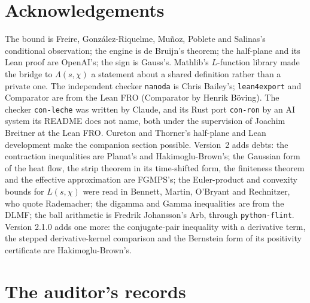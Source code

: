 \documentclass[11pt]{article}
\theoremstyle{definition}
\newcommand{\lean}[1]{\texttt{#1}}
\newcommand{\Lc}{\Lambda}
\begin{document}
\section*{Acknowledgements}

The bound is Freire, Gonz\'alez-Riquelme, Mu\~noz, Poblete and Salinas's conditional observation; the engine is de Bruijn's theorem; the half-plane and its Lean proof are OpenAI's; the sign is Gauss's. Mathlib's $L$-function library made the bridge to $\Lc(s,\chi)$ a statement about a shared definition rather than a private one. The independent checker \lean{nanoda} is Chris Bailey's; \lean{lean4export} and Comparator are from the Lean FRO (Comparator by Henrik B\"oving). The checker \lean{con-leche} \cite{conleche} was written by Claude, and its Rust port \lean{con-ron} \cite{conron} by an AI system its README does not name, both under the supervision of Joachim Breitner at the Lean FRO. Cureton and Thorner's half-plane and Lean development make the companion section possible. Version~2 adds debts: the contraction inequalities are Planat's and Hakimoglu-Brown's; the Gaussian form of the heat flow, the strip theorem in its time-shifted form, the finiteness theorem and the effective approximation are FGMPS's; the Euler-product and convexity bounds for $L(s,\chi)$ were read in Bennett, Martin, O'Bryant and Rechnitzer, who quote Rademacher; the digamma and Gamma inequalities are from the DLMF; the ball arithmetic is Fredrik Johansson's Arb, through \lean{python-flint}. Version 2.1.0 adds one more: the conjugate-pair inequality with a derivative term, the stepped derivative-kernel comparison and the Bernstein form of its positivity certificate are Hakimoglu-Brown's.




\appendix
\section{The auditor's records}\label{app:records}
\end{document}
